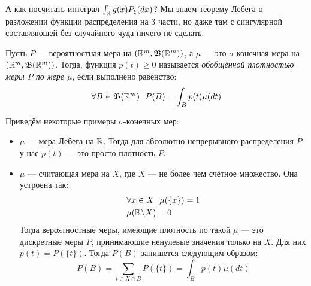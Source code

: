 \begin{note}
	А как посчитать интеграл $\int_{\mathbb{R}} g(x)P_\xi(dx)$? Мы знаем теорему Лебега о разложении функции распределения на 3 части, но даже там с сингулярной составляющей без случайного чуда ничего не сделать.
\end{note}

\begin{definition}
	Пусть $P$ --- вероятностная мера на $(\mathbb{R}^m, \mathfrak{B}(\mathbb{R}^m))$, а $\mu$ --- это $\sigma$-конечная мера на $(\mathbb{R}^m, \mathfrak{B}(\mathbb{R}^m))$. Тогда, функция $p(t) \ge 0$ называется \textit{обобщённой плотностью меры $P$ по мере $\mu$}, если выполнено равенство:
	\[
		\forall B \in \mathfrak{B}(\mathbb{R}^m)\ \ P(B) = \int_B p(t)\mu(dt)
	\]
\end{definition}

\begin{example}
	Приведём некоторые примеры $\sigma$-конечных мер:
	\begin{itemize}
		\item $\mu$ --- мера Лебега на $\mathbb{R}$. Тогда для абсолютно непрерывного распределения $P$ у нас $p(t)$ --- это просто плотность $P$.
		
		\item $\mu$ --- считающая мера на $X$, где $X$ --- не более чем счётное множество. Она устроена так:
		\begin{align*}
			&{\forall x \in X\ \ \mu(\{x\}) = 1}
			\\
			&{\mu(\mathbb{R} \backslash X) = 0}
		\end{align*}
		Тогда вероятностные меры, имеющие плотность по такой $\mu$ --- это дискретные меры $P$, принимающие ненулевые значения только на $X$. Для них $p(t) = P(\{t\})$. Тогда $P(B)$ запишется следующим образом:
		\[
			P(B) = \sum_{t \in X \cap B} P(\{t\}) = \int_B p(t)\mu(dt)
		\]
	\end{itemize}
\end{example}